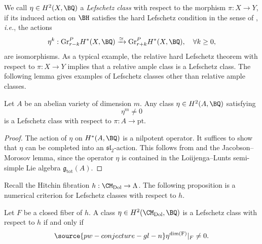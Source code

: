 We call $\eta \in H^2(X, \BQ)$ a \emph{Lefschetz class} with respect to the morphism $\pi: X\to Y$, if its induced action on $\BH$ satisfies the hard Lefschetz condition in the sense of \cite[Assumption 2.3.1]{dC}, \emph{i.e.}, the actions
\[
\eta^k: \mathrm{Gr}^P_{r-k}H^*(X, \BQ) \xrightarrow{\simeq}  \mathrm{Gr}^P_{r+k}H^*(X, \BQ), \quad \forall k\geq 0,
\]
are isomorphisms. As a typical example, the relative hard Lefschetz theorem \cite{BBD} with respect to $\pi: X \to Y$ implies that a relative ample class is a Lefschetz class. The following lemma gives examples of Lefschetz classes other than relative ample classes.

\begin{lem}
\notready\label{Lemma3.1}
Let $A$ be an abelian variety of dimension $m$. Any class $\eta \in H^2(A, \BQ)$ satisfying
\[
\eta^m \neq 0
\]
is a Lefschetz class with respect to $\pi: A \to \mathrm{pt}$.
\end{lem}

\begin{proof}
The action of $\eta$ on $H^*(A, \BQ)$ is a nilpotent operator. It suffices to show that $\eta$ can be completed into an $\mathfrak{sl}_2$-action. This follows from \cite[Proposition 3.3]{LL} and the Jacobson--Morosov lemma, since the operator $\eta$ is contained in the Loiijenga--Lunts semi-simple Lie algebra $\mathfrak{g}_{\mathrm{tot}}(A)$.
\end{proof}

Recall the Hitchin fibration $h: \CM_{\mathrm{Dol}} \to \Lambda$. The following proposition is a numerical criterion for Lefschetz classes with respect to $h$.

\begin{prop}
\notready\label{prop3.2_Hitchin}
Let $F$ be a closed fiber of $h$. A class $\eta \in H^2(\CM_{\mathrm{Dol}}, \BQ)$ is a Lefschetz class with respect to $h$ if and only if
\begin{equation}\label{eqn50}
\source{pw-conjecture-gl-n}
\eta^{\mathrm{dim(F)}}|_{F} \neq 0.
\end{equation}
\end{prop}

